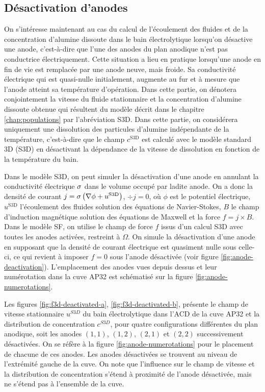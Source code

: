 \subsection{Désactivation d'anodes}
On s'intéresse maintenant au cas du calcul de l'écoulement des fluides
et de la concentration d'alumine dissoute dans le bain électrolytique
lorsqu'on désactive une anode, c'est-à-dire que l'une des anodes du
plan anodique n'est pas conductrice électriquement. Cette situation a
lieu en pratique lorsqu'une anode en fin de vie est remplacée par une
anode neuve, mais froide. Sa conductivité électrique qui est
quasi-nulle initialement, augmente au fur et à mesure que l'anode
atteint sa température d'opération. Dans cette partie, on dénotera
conjointement la vitesse du fluide stationnaire et la concentration
d'alumine dissoute obtenue qui résultent du modèle décrit dans le
chapitre \ref{chap:populations} par l'abréviation S3D. Dans cette
partie, on considérera uniquement une dissolution des particules
d'alumine indépendante de la température, c'est-à-dire que le champ
$c^\mathrm{S3D}$ est calculé avec le modèle standard 3D (S3D) en désactivant
la dépendance de la vitesse de dissolution en fonction de la
température du bain.

Dans le modèle S3D, on peut simuler la désactivation d'une anode en
annulant la conductivité électrique $\sigma$ dans le volume
occupé par ladite anode. On a donc la densité de courant $j =
\sigma\left( \nabla \phi + u^\mathrm{S3D} \right)$, $\div j = 0$, où
$\phi$ est le potentiel électrique, $u^\mathrm{S3D}$ l'écoulement des
fluides solution des équations de Navier-Stokes, $B$ le champ
d'induction magnétique solution des équations de Maxwell et la force
$f = j\times B$. Dans le modèle SF, on utilise le champ de force $f$
issus d'un calcul S3D avec toutes les anodes activées, restreint à
$\Omega$. On simule la désactivation d'une anode en supposant que la
densité de courant électrique est quasiment nulle sous celle-ci, ce
qui revient à imposer $f = 0$ sous l'anode désactivée (voir figure
\ref{fig:anode-deactivation}). L'emplacement des anodes vues depuis
dessus et leur numérotation dans la cuve AP32 est schématisé sur la
figure \ref{fig:anode-numerotations}.

Les figures \ref{fig:f3d-deactivated-a}, \ref{fig:f3d-deactivated-b},
présente le champ de vitesse stationnaire $u^{S3D}$ du bain
électrolytique dans l'ACD de la cuve AP32 et la distribution de
concentration $c^{S3D}$, pour quatre configurations différentes du
plan anodique, soit les anodes $(1,1)$, $(1,2)$, $(2,1)$ et $(2,2)$
successivement désactivées. On se réfère à la figure
\ref{fig:anode-numerotations} pour le placement de chacune de ces
anodes. Les anodes désactivées se trouvent au niveau de l'extrémité
gauche de la cuve. On note que l'influence sur le champ de vitesse et
la distribution de concentration s'étend à proximité de l'anode
désactivée, mais ne s'étend pas à l'ensemble de la cuve.

